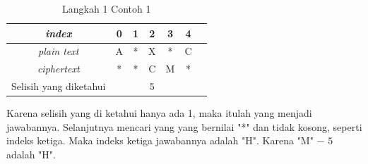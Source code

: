 	\begin{table}[H]
	 	\centering
		\caption{Langkah 1 Contoh 1}	 	
	 	\setlength{\arrayrulewidth}{.08em}
	 	\begin{tabular}{|c|c|c|c|c|c|c|}\hline
	 	\textit{index}&0&1&2&3&4\\ \hline
	 	\textit{plain text}&\cellcolor{blue!15}A&\cellcolor{lime!15}*&\cellcolor{yellow!25}X&\cellcolor{green!15}*&\cellcolor{pink!25}C\\ \hline
	 	\textit{ciphertext}&\cellcolor{blue!15}*&\cellcolor{lime!15}*&\cellcolor{yellow!25}C&\cellcolor{green!15}M&\cellcolor{pink!25}*\\ \hline
	 	Selisih yang diketahui& & &5& & \\ \hline
	 	\end{tabular}
	 	\label{tab:langkah1contoh1}
	\end{table}
	
	  Karena selisih yang di ketahui hanya ada 1, maka itulah yang menjadi jawabannya. Selanjutnya mencari yang \plaintext yang bernilai "*" dan \ciphertext tidak kosong, seperti indeks ketiga. Maka indeks ketiga jawabannya adalah "H". Karena "M" $-$ $5$ adalah "H".
	 
	 
	 
